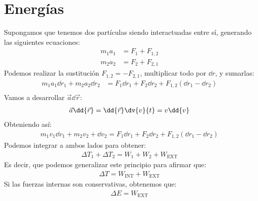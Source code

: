 \documentclass{article}
\begin{document}
\section{Energías}
Supongamos que tenemos dos partículas siendo interactuadas entre sí, generando las siguientes
ecuaciones:
\begin{equation}
    \begin{split}
        m_{1} a_{1} &= F_{1} + F_{1,2}\\
        m_{2} a_{2} &= F_{2} + F_{2,1}
    \end{split}
\end{equation}
Podemos realizar la sustitución $F_{1,2} = -F_{2,1}$, multiplicar todo por $ \dd{r}$, y sumarlas:
\begin{equation}
    \begin{split}
        m_{1} a_{1} \dd{r}_{1} +m_{2} a_{2} \dd{r}_{2} &= F_{1} \dd{r}_{1}+ F_{2} \dd{r}_{2}
        + F_{1,2}( \dd{r}_{1} - \dd{r}_2)\\
    \end{split}
\end{equation}
Vamos a desarrollar $\vec{a} \dd{\vec{r}}$:
\begin{equation}
    \begin{split}
        \vec{a} \dd{\vec{r}} = \dd{\vec{r}} \dv{v}{t} = v \dd{v}
    \end{split}
\end{equation}
Obteniendo así:
\begin{equation}
    \begin{split}
        m_{1} v_{1} \dd{v_{1}} +m_{2} v_{2} + \dd{v_{2}} = F_{1} \dd{r}_{1}+ F_{2} \dd{r}_{2}
        + F_{1,2}( \dd{r}_{1} - \dd{r}_2)
    \end{split}
\end{equation}
Podemos integrar a ambos lados para obtener:
\begin{equation}
    \begin{split}
        \Delta T_{1} + \Delta T_{2} = W_{1} + W_{2} + W_{\text{EXT}} 
    \end{split}
\end{equation}
Es decir, que podemos generalizar este principio para afirmar que:
\begin{equation}
    \begin{split}
        \Delta T = W_{\text{INT}} + W_{\text{EXT}} 
    \end{split}
\end{equation}
Si las fuerzas internas son conservativas, obtenemos que:
\begin{equation}
    \begin{split}
        \Delta E = W_{\text{EXT}}
    \end{split}
\end{equation}
\end{document}
